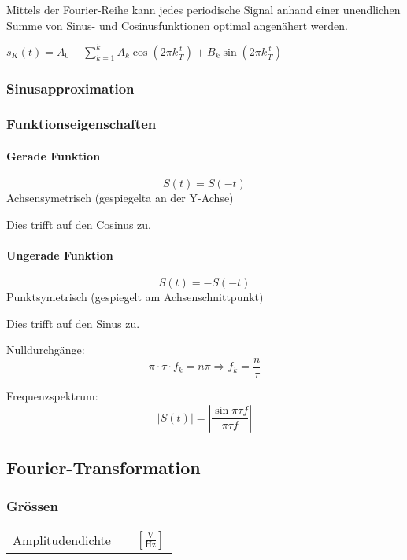 \begin{multicols}{2}
	Mittels der Fourier-Reihe kann jedes periodische Signal anhand einer unendlichen Summe von Sinus- und Cosinusfunktionen optimal angenähert werden.

	$s_K(t) = A_0 + \sum^k_{k=1}{A_k \cos{(2 \pi k \frac{t}{T})} + B_k \sin{(2 \pi k \frac{t}{T})}}$


\subsubsection{Sinusapproximation}

\subsubsection{Funktionseigenschaften}

\paragraph{Gerade Funktion}
	\[
		S(t) = S(-t)
	\]
	Achsensymetrisch (gespiegelta an der Y-Achse)
	
	Dies trifft auf den Cosinus zu.

\paragraph{Ungerade Funktion}
	\[
		S(t) = -S(-t)
	\]
	Punktsymetrisch (gespiegelt am Achsenschnittpunkt)
	
	Dies trifft auf den Sinus zu.
	
	Nulldurchgänge:
	\[
		\pi \cdot \tau \cdot f_k = n \pi \Rightarrow  f_k = \frac{n}{\tau}
	\]

Frequenzspektrum:
	\[
		\left| S(t) \right| = \left| \frac{\sin{\pi \tau f}}{\pi \tau f} \right|
	\]		


\subsection{Fourier-Transformation}

\subsubsection{Grössen}
	\begin{tabular}{l l l}
		Amplitudendichte & & $\left[\frac{\text{V}}{\text{Hz}}\right]$
	\end{tabular}


\end{multicols}
